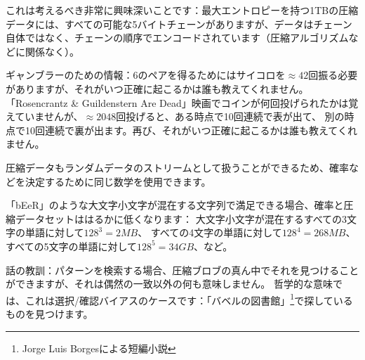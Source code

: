 これは考えるべき非常に興味深いことです：最大エントロピーを持つ1TBの圧縮データには、すべての可能な5バイトチェーンがありますが、データはチェーン自体ではなく、チェーンの順序でエンコードされています（圧縮アルゴリズムなどに関係なく）。

ギャンブラーのための情報：6のペアを得るためにはサイコロを$\approx 42$回振る必要がありますが、それがいつ正確に起こるかは誰も教えてくれません。
「Rosencrantz \& Guildenstern Are Dead」映画でコインが何回投げられたかは覚えていませんが、$\approx 2048$回投げると、ある時点で10回連続で表が出て、
別の時点で10回連続で裏が出ます。再び、それがいつ正確に起こるかは誰も教えてくれません。

圧縮データもランダムデータのストリームとして扱うことができるため、確率などを決定するために同じ数学を使用できます。

「bEeR」のような大文字小文字が混在する文字列で満足できる場合、確率と圧縮データセットははるかに低くなります：
大文字小文字が混在するすべての3文字の単語に対して$128^3=2MB$、
すべての4文字の単語に対して$128^4=268MB$、
すべての5文字の単語に対して$128^5=34GB$、など。

話の教訓：パターンを検索する場合、圧縮ブロブの真ん中でそれを見つけることができますが、それは偶然の一致以外の何も意味しません。
哲学的な意味では、これは選択/確認バイアスのケースです：「バベルの図書館」\footnote{Jorge Luis Borgesによる短編小説}で探しているものを見つけます。